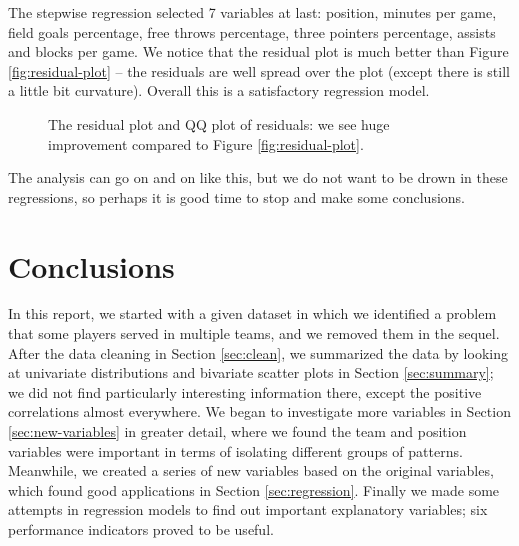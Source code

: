 \documentclass[english]{article}
\newenvironment{dummy}{\par}{\par}
\begin{document}
The stepwise regression selected 7 variables at last: position, minutes
per game, field goals percentage, free throws percentage, three pointers
percentage, assists and blocks per game. We notice that the residual
plot is much better than Figure \ref{fig:residual-plot} -- the residuals
are well spread over the plot (except there is still a little bit
curvature). Overall this is a satisfactory regression model.

%
\begin{figure}
\begin{dummy}

\begin{center}


\endpgfgraphicnamed
\end{center}
\end{dummy}
\caption{The residual plot and QQ plot of residuals: we see huge improvement
compared to Figure \ref{fig:residual-plot}.\label{fig:residual-new}}

\end{figure}


The analysis can go on and on like this, but we do not want to be
drown in these regressions, so perhaps it is good time to stop and
make some conclusions.


\section{Conclusions}

In this report, we started with a given dataset in which we identified
a problem that some players served in multiple teams, and we removed
them in the sequel. After the data cleaning in Section \ref{sec:clean},
we summarized the data by looking at univariate distributions and
bivariate scatter plots in Section \ref{sec:summary}; we did not
find particularly interesting information there, except the positive
correlations almost everywhere. We began to investigate more variables
in Section \ref{sec:new-variables} in greater detail, where we found
the team and position variables were important in terms of isolating
different groups of patterns. Meanwhile, we created a series of new
variables based on the original variables, which found good applications
in Section \ref{sec:regression}. Finally we made some attempts in
regression models to find out important explanatory variables; six
performance indicators proved to be useful.
\end{document}

